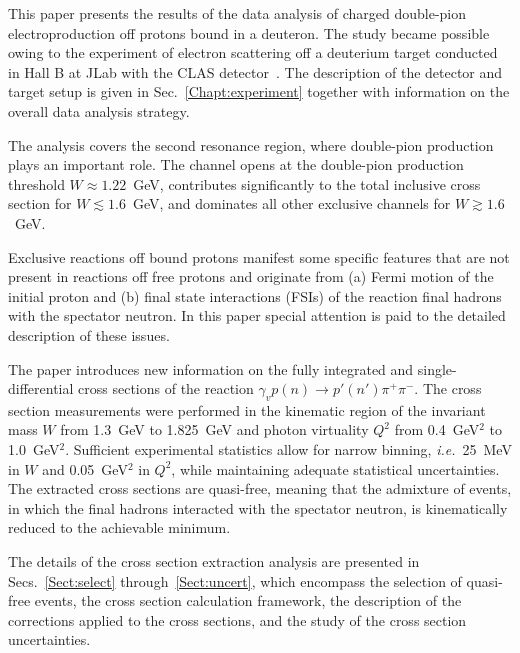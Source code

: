 \documentclass[prc,twocolumn,superscriptaddress,showpacs,amssymb,amsmath,amsfonts,aps,nofootinbib]{revtex4-1}
\begin{document}
This paper presents the results of the data analysis of charged double-pion electroproduction off protons bound in a deuteron. The study became possible owing to the experiment of electron scattering off a deuterium target conducted in Hall B at JLab with the CLAS detector~\cite{Mecking:2003zu}. The description of the detector and target setup is given in Sec.\!~\ref{Chapt:experiment} together with information on the overall data analysis strategy.  



The analysis covers the second resonance region, where double-pion production plays an important role. The channel opens at the double-pion production threshold $W \approx 1.22$~GeV, contributes significantly to the total inclusive cross section for $W \lesssim 1.6$~GeV, and dominates all other exclusive channels for $W \gtrsim 1.6$~GeV.



Exclusive reactions off bound protons manifest some specific features that are not present in reactions off free protons and originate from (a) Fermi motion of the initial proton and (b) final state interactions (FSIs) of the reaction final hadrons with the spectator neutron. In this paper special attention is paid to the detailed description of these issues.




The paper introduces new information on the fully integrated and single-differential cross sections of the reaction $\gamma_{v}p(n) \rightarrow p' (n')\pi^{+}\pi^{-}$. The cross section measurements were performed in the kinematic region of the invariant mass $W$ from 1.3~GeV to 1.825~GeV and photon virtuality $Q^{2}$ from 0.4~GeV$^2$ to 1.0~GeV$^2$. Sufficient experimental statistics allow for narrow binning, {\it i.e.}~25~MeV in $W$ and 0.05~GeV$^2$ in $Q^2$, while maintaining adequate statistical uncertainties. The extracted cross sections are quasi-free, meaning that the admixture of events, in which the final hadrons interacted with the spectator neutron, is kinematically reduced to the achievable minimum.



The details of the cross section extraction analysis are presented in Secs.~\ref{Sect:select} through~\ref{Sect:uncert}, which encompass the selection of quasi-free events, the cross section calculation framework, the description of the corrections applied to the cross sections, and the study of the cross section uncertainties. 
\end{document}
